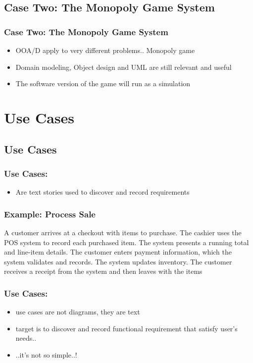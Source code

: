 \documentclass{beamer}
\begin{document}
\subsection{Case Two: The Monopoly Game System}
\begin{frame}
	\frametitle{Case Two: The Monopoly Game System}
  	\begin{itemize}
	\item<+-> OOA/D apply to very different problems.. Monopoly game
	\item<+-> Domain modeling, Object design and UML are still relevant and useful
	\item<+-> The software version of the game will run as a simulation
   \end{itemize}
\end{frame}

\section{Use Cases}
\subsection{Use Cases}
\begin{frame}
	\frametitle{Use Cases:}
	\begin{itemize}
	\item<+-> Are text stories used to discover and record requirements
	\end{itemize}
\end{frame}

\begin{frame}
	\frametitle{Example: Process Sale}
	\begin{center}
	A customer arrives at a checkout with items to purchase. The cashier uses
the POS system to record each purchased item. The system presents a running total and
line-item details. The customer enters payment information, which the system validates and
records. The system updates inventory. The customer receives a receipt from the system
and then leaves with the items
	\end{center}
\end{frame}

\begin{frame}
	\frametitle{Use Cases:}
	\begin{itemize}
	\item<+-> use cases are not diagrams, they are text
	\item<+-> target is to discover and record functional requirement that satisfy user's needs..
	\item<+-> ..it's not so simple..!
	\end{itemize}
\end{frame}
\end{document}
